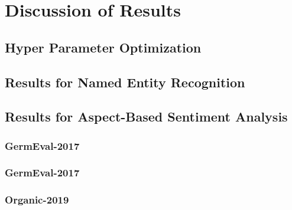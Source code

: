 \chapter{Discussion of Results}
\label{ch:discussion}

\section{Hyper Parameter Optimization}

\section{Results for Named Entity Recognition}

\section{Results for Aspect-Based Sentiment Analysis}

\subsection{GermEval-2017}


\subsection{GermEval-2017}

\subsection{Organic-2019}


